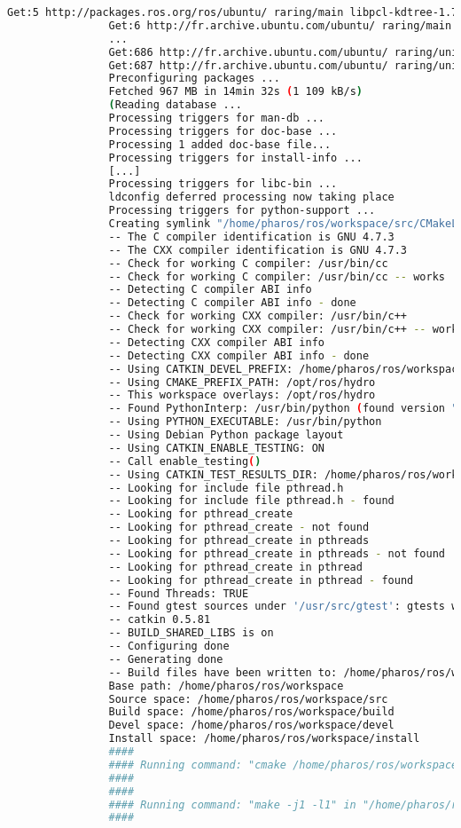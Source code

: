 \documentclass[a4paper,10pt,twoside]{book}
\begin{document}
\begin{lstlisting}[language=bash,title={\installationTool{} Installing Hydro in Ubuntu: Raring - Output}]
				Get:5 http://packages.ros.org/ros/ubuntu/ raring/main libpcl-kdtree-1.7 i386 1.7.0-2+raring1 [239 kB]
				Get:6 http://fr.archive.ubuntu.com/ubuntu/ raring/main libgssrpc4 i386 1.10.1+dfsg-4+nmu1 [57,5 kB]
				...
				Get:686 http://fr.archive.ubuntu.com/ubuntu/ raring/universe libbullet2.80 i386 2.80+sp1+dfsg-0ubuntu1 [754 kB]
				Get:687 http://fr.archive.ubuntu.com/ubuntu/ raring/universe libbullet-dev i386 2.80+sp1+dfsg-0ubuntu1 [362 kB]
				Preconfiguring packages ...
				Fetched 967 MB in 14min 32s (1 109 kB/s)
				(Reading database ... 
				Processing triggers for man-db ...
				Processing triggers for doc-base ...
				Processing 1 added doc-base file...
				Processing triggers for install-info ...
				[...]
				Processing triggers for libc-bin ...
				ldconfig deferred processing now taking place
				Processing triggers for python-support ...
				Creating symlink "/home/pharos/ros/workspace/src/CMakeLists.txt" pointing to "/opt/ros/hydro/share/catkin/cmake/toplevel.cmake"
				-- The C compiler identification is GNU 4.7.3
				-- The CXX compiler identification is GNU 4.7.3
				-- Check for working C compiler: /usr/bin/cc
				-- Check for working C compiler: /usr/bin/cc -- works
				-- Detecting C compiler ABI info
				-- Detecting C compiler ABI info - done
				-- Check for working CXX compiler: /usr/bin/c++
				-- Check for working CXX compiler: /usr/bin/c++ -- works
				-- Detecting CXX compiler ABI info
				-- Detecting CXX compiler ABI info - done
				-- Using CATKIN_DEVEL_PREFIX: /home/pharos/ros/workspace/devel
				-- Using CMAKE_PREFIX_PATH: /opt/ros/hydro
				-- This workspace overlays: /opt/ros/hydro
				-- Found PythonInterp: /usr/bin/python (found version "2.7.4") 
				-- Using PYTHON_EXECUTABLE: /usr/bin/python
				-- Using Debian Python package layout
				-- Using CATKIN_ENABLE_TESTING: ON
				-- Call enable_testing()
				-- Using CATKIN_TEST_RESULTS_DIR: /home/pharos/ros/workspace/build/test_results
				-- Looking for include file pthread.h
				-- Looking for include file pthread.h - found
				-- Looking for pthread_create
				-- Looking for pthread_create - not found
				-- Looking for pthread_create in pthreads
				-- Looking for pthread_create in pthreads - not found
				-- Looking for pthread_create in pthread
				-- Looking for pthread_create in pthread - found
				-- Found Threads: TRUE  
				-- Found gtest sources under '/usr/src/gtest': gtests will be built
				-- catkin 0.5.81
				-- BUILD_SHARED_LIBS is on
				-- Configuring done
				-- Generating done
				-- Build files have been written to: /home/pharos/ros/workspace/build
				Base path: /home/pharos/ros/workspace
				Source space: /home/pharos/ros/workspace/src
				Build space: /home/pharos/ros/workspace/build
				Devel space: /home/pharos/ros/workspace/devel
				Install space: /home/pharos/ros/workspace/install
				####
				#### Running command: "cmake /home/pharos/ros/workspace/src -DCATKIN_DEVEL_PREFIX=/home/pharos/ros/workspace/devel -DCMAKE_INSTALL_PREFIX=/home/pharos/ros/workspace/install" in "/home/pharos/ros/workspace/build"
				####
				####
				#### Running command: "make -j1 -l1" in "/home/pharos/ros/workspace/build"
				####




\end{lstlisting}
\end{document}
